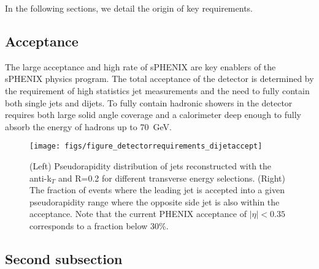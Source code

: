 In the following sections, we detail the origin of key requirements.

\subsection{Acceptance}

The large acceptance and high rate of sPHENIX are key enablers of the sPHENIX 
physics program.
The total
acceptance of the detector is determined by the requirement of high
statistics jet measurements and the need to fully contain both single
jets and dijets.  To fully contain hadronic showers in the detector
requires both large solid angle coverage and a calorimeter deep enough
to fully absorb the energy of hadrons up to 70~GeV.

\begin{figure}[hbt!]
 \begin{center}
  \hfill
  \texttt{[image: figs/figure\_detectorrequirements\_dijetaccept]}
  \caption[Pseudorapidity distribution of \pythia jets reconstructed
  with the \fastjet anti-k$_{T}$ and the fraction of events in which
  the leading and subleading jet are in the specified
  acceptance]{\label{fig:pythia_dijet_accept}(Left) Pseudorapidity
    distribution of \pythia jets reconstructed with the \fastjet
    anti-k$_{T}$ and R=0.2 for different transverse energy selections.
    (Right) The fraction of \pythia events where the leading jet is
    accepted into a given pseudorapidity range where the opposite side
    jet is also within the acceptance.  Note that the current PHENIX
    acceptance of $|\eta|<0.35$ corresponds to a fraction below 30\%.}
 \end{center}
\end{figure}

\subsection{Second subsection}
